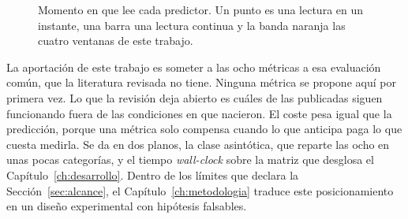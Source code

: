 \begin{figure}[htbp]
\centering
{}
\caption{Momento en que lee cada predictor. Un punto es una lectura en un instante, una barra una lectura continua y la banda naranja las cuatro ventanas de este trabajo.}
\label{fig:sota-momento}
\end{figure}

La aportación de este trabajo es someter a las ocho métricas a esa evaluación común, que la literatura revisada no tiene. Ninguna métrica se propone aquí por primera vez. Lo que la revisión deja abierto es cuáles de las publicadas siguen funcionando fuera de las condiciones en que nacieron. El coste pesa igual que la predicción, porque una métrica solo compensa cuando lo que anticipa paga lo que cuesta medirla. Se da en dos planos, la clase asintótica, que reparte las ocho en unas pocas categorías, y el tiempo \emph{wall-clock} sobre la matriz que desglosa el Capítulo~\ref{ch:desarrollo}. Dentro de los límites que declara la Sección~\ref{sec:alcance}, el Capítulo~\ref{ch:metodologia} traduce este posicionamiento en un diseño experimental con hipótesis falsables.

